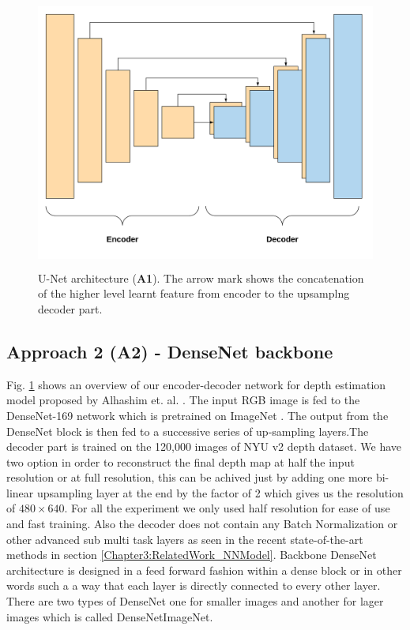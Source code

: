 \begin{figure}[t]
    \centering
    \includegraphics[width = 14cm, height = 9cm]{Figures/A1.png}
    \caption{U-Net architecture (\textbf{A1}). The arrow mark shows the concatenation of the higher level learnt feature from encoder to the upsamplng decoder part.}
    \label{fig:A1-U-NetArchetecture}
\end{figure}{}


\subsection{Approach 2 (A2) - DenseNet backbone}

Fig. \ref{fig:A1-U-NetArchetecture} shows an overview of our encoder-decoder network for depth estimation model proposed by Alhashim et. al. \cite{Alhashim2018}. The input RGB image is fed to the DenseNet-169 \cite{huang2017densely} network which is pretrained on ImageNet \cite{deng2009imagenet}. The output from the DenseNet block is then fed to a successive series of up-sampling layers.The decoder part is trained on the 120,000 images of NYU v2 depth dataset.  We have two option in order to reconstruct the final depth map at half the input resolution or at full resolution, this can be achived just by adding one more bi-linear upsampling layer at the end by the factor of 2 which gives us the resolution of $480 \times 640$.  For all the experiment we only used half resolution for ease of use and fast training.  Also the decoder does not contain any Batch Normalization or other advanced sub multi task layers as seen in the recent state-of-the-art methods in section \ref{Chapter3:RelatedWork_NNModel}. Backbone DenseNet architecture is designed in a feed forward fashion within a dense block or in other words such a a way that each layer is directly connected to every other layer. There are two types of DenseNet one for smaller images and another for lager images which is called DenseNetImageNet. 

